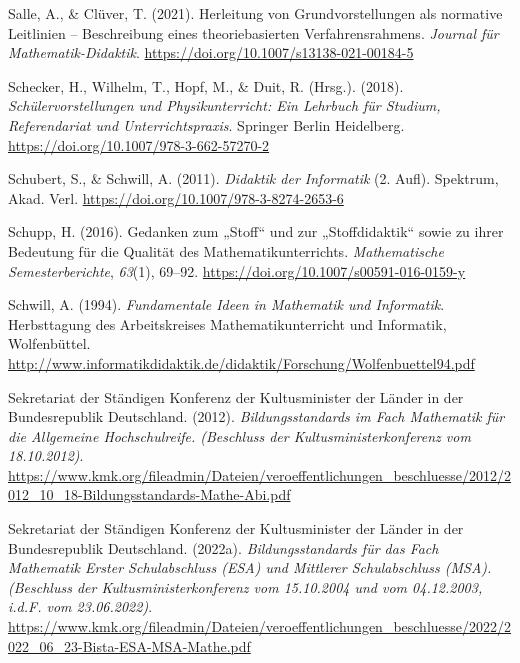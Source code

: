 \documentclass[
]{scrbook}
\newlength{\cslhangindent}
\newenvironment{CSLReferences}[2] %
 {\begin{list}{}{%
  \setlength{\itemindent}{0pt}
  \setlength{\leftmargin}{0pt}
  \setlength{\parsep}{0pt}
  \ifodd #1
   \setlength{\leftmargin}{\cslhangindent}
   \setlength{\itemindent}{-1\cslhangindent}
  \fi
  \setlength{\itemsep}{#2\baselineskip}}}
 {\end{list}}
\theoremstyle{definition}
\theoremstyle{definition}
\theoremstyle{definition}
\theoremstyle{definition}
\theoremstyle{remark}
\begin{document}
\begin{CSLReferences}{1}{0}
Salle, A., \& Clüver, T. (2021). Herleitung von {Grundvorstellungen} als normative {Leitlinien} -- {Beschreibung} eines theoriebasierten {Verfahrensrahmens}. \emph{Journal für Mathematik-Didaktik}. \url{https://doi.org/10.1007/s13138-021-00184-5}

Schecker, H., Wilhelm, T., Hopf, M., \& Duit, R. (Hrsg.). (2018). \emph{Schülervorstellungen und {Physikunterricht}: {Ein} {Lehrbuch} für {Studium}, {Referendariat} und {Unterrichtspraxis}}. Springer Berlin Heidelberg. \url{https://doi.org/10.1007/978-3-662-57270-2}

Schubert, S., \& Schwill, A. (2011). \emph{Didaktik der {Informatik}} (2. Aufl). Spektrum, Akad. Verl. \url{https://doi.org/10.1007/978-3-8274-2653-6}

Schupp, H. (2016). Gedanken zum „{Stoff}`` und zur „{Stoffdidaktik}`` sowie zu ihrer {Bedeutung} für die {Qualität} des {Mathematikunterrichts}. \emph{Mathematische Semesterberichte}, \emph{63}(1), 69--92. \url{https://doi.org/10.1007/s00591-016-0159-y}

Schwill, A. (1994). \emph{Fundamentale {Ideen} in {Mathematik} und {Informatik}}. Herbsttagung des Arbeitskreises Mathematikunterricht und Informatik, Wolfenbüttel. \url{http://www.informatikdidaktik.de/didaktik/Forschung/Wolfenbuettel94.pdf}

Sekretariat der Ständigen Konferenz der Kultusminister der Länder in der Bundesrepublik Deutschland. (2012). \emph{Bildungsstandards im {Fach} {Mathematik} für die {Allgemeine} {Hochschulreife}. (Beschluss der Kultusministerkonferenz vom 18.10.2012)}. \url{https://www.kmk.org/fileadmin/Dateien/veroeffentlichungen_beschluesse/2012/2012_10_18-Bildungsstandards-Mathe-Abi.pdf}

Sekretariat der Ständigen Konferenz der Kultusminister der Länder in der Bundesrepublik Deutschland. (2022a). \emph{Bildungsstandards für das {Fach} {Mathematik} {Erster} {Schulabschluss} ({ESA}) und {Mittlerer} {Schulabschluss} ({MSA}). ({Beschluss} der {Kultusministerkonferenz} vom 15.10.2004 und vom 04.12.2003, i.d.{F}. vom 23.06.2022)}. \url{https://www.kmk.org/fileadmin/Dateien/veroeffentlichungen_beschluesse/2022/2022_06_23-Bista-ESA-MSA-Mathe.pdf}


\end{CSLReferences}
\end{document}
